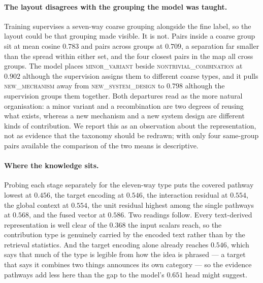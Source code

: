 \paragraph{The layout disagrees with the grouping the model was taught.}
Training supervises a seven-way coarse grouping alongside the fine label, so the layout
could be that grouping made visible. It is not. Pairs inside a coarse group sit at mean
cosine $0.783$ and pairs across groups at $0.709$, a separation far smaller than the
spread within either set, and the four closest pairs in the map all cross groups. The
model places \textsc{minor\_variant} beside \textsc{nontrivial\_combination} at $0.902$
although the supervision assigns them to different coarse types, and it pulls
\textsc{new\_mechanism} away from \textsc{new\_system\_design} to $0.798$ although the
supervision groups them together. Both departures read as the more natural organisation:
a minor variant and a recombination are two degrees of reusing what exists, whereas a new
mechanism and a new system design are different kinds of contribution. We report this as
an observation about the representation, not as evidence that the taxonomy should be
redrawn; with only four same-group pairs available the comparison of the two means is
descriptive.

\paragraph{Where the knowledge sits.}
Probing each stage separately for the eleven-way type puts the covered pathway lowest at
$0.456$, the target encoding at $0.546$, the interaction residual at $0.554$, the global
context at $0.554$, the unit residual highest among the single pathways at $0.568$, and
the fused vector at $0.586$. Two readings follow. Every text-derived representation is
well clear of the $0.368$ the input scalars reach, so the contribution type is genuinely
carried by the encoded text rather than by the retrieval statistics. And the target
encoding alone already reaches $0.546$, which says that much of the type is legible from
how the idea is phrased --- a target that says it combines two things announces its own
category --- so the evidence pathways add less here than the gap to the model's $0.651$
head might suggest.
